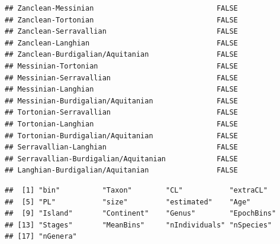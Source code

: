 \documentclass[]{article}
\begin{document}
\begin{verbatim}
## Zanclean-Messinian                             FALSE
## Zanclean-Tortonian                             FALSE
## Zanclean-Serravallian                          FALSE
## Zanclean-Langhian                              FALSE
## Zanclean-Burdigalian/Aquitanian                FALSE
## Messinian-Tortonian                            FALSE
## Messinian-Serravallian                         FALSE
## Messinian-Langhian                             FALSE
## Messinian-Burdigalian/Aquitanian               FALSE
## Tortonian-Serravallian                         FALSE
## Tortonian-Langhian                             FALSE
## Tortonian-Burdigalian/Aquitanian               FALSE
## Serravallian-Langhian                          FALSE
## Serravallian-Burdigalian/Aquitanian            FALSE
## Langhian-Burdigalian/Aquitanian                FALSE
\end{verbatim}

\begin{verbatim}
##  [1] "bin"          "Taxon"        "CL"           "extraCL"     
##  [5] "PL"           "size"         "estimated"    "Age"         
##  [9] "Island"       "Continent"    "Genus"        "EpochBins"   
## [13] "Stages"       "MeanBins"     "nIndividuals" "nSpecies"    
## [17] "nGenera"
\end{verbatim}
\end{document}
